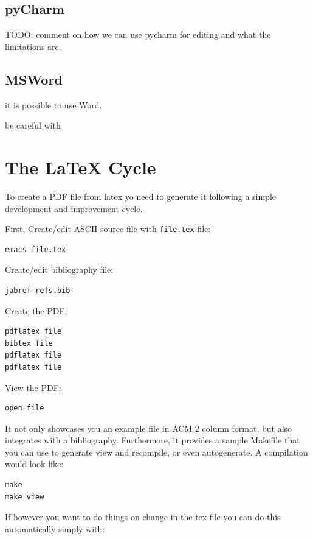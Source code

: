 \subsection{pyCharm}

TODO: comment on how we can use pycharm for editing and what the
limitations are.

\subsection{MSWord}

it is possible to use Word.

be careful with 

\section{The LaTeX Cycle}\label{the-latex-cycle}

To create a PDF file from latex yo need to generate it following a
simple development and improvement cycle.

First, Create/edit ASCII source file with \texttt{file.tex} file:

\begin{verbatim}
emacs file.tex
\end{verbatim}

Create/edit bibliography file:

\begin{verbatim}
jabref refs.bib
\end{verbatim}

Create the PDF:

\begin{verbatim}
pdflatex file
bibtex file
pdflatex file
pdflatex file
\end{verbatim}

View the PDF:

\begin{verbatim}
open file
\end{verbatim}

It not only showcases you an example file in ACM 2 column format, but
also integrates with a bibliography. Furthermore, it provides a sample
Makefile that you can use to generate view and recompile, or even
autogenerate. A compilation would look like:

\begin{verbatim}
make
make view
\end{verbatim}

If however you want to do things on change in the tex file you can do
this automatically simply with:

